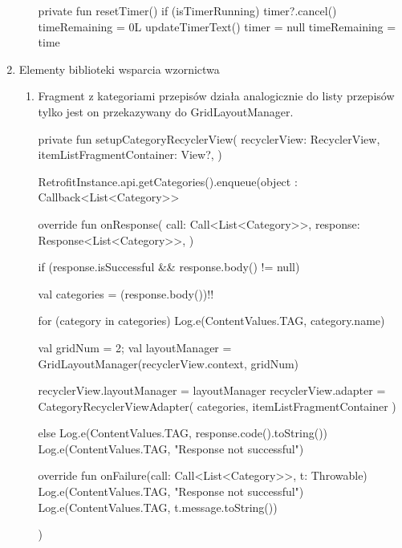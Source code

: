 \documentclass{article}
\begin{document}
\begin{enumerate}
\begin{enumerate}
\begin{mylisting}
private fun resetTimer() {
    if (isTimerRunning) {
        timer?.cancel()
        timeRemaining = 0L
        updateTimerText()
        timer = null
        timeRemaining = time
    }
}
\end{mylisting}

\end{enumerate}

\newpage

\item Elementy biblioteki wsparcia wzornictwa
\begin{enumerate}
    \item Fragment z kategoriami przepisów działa analogicznie do listy przepisów
     tylko jest on 
    przekazywany do GridLayoutManager.
\begin{mylisting}
private fun setupCategoryRecyclerView(
    recyclerView: RecyclerView,
    itemListFragmentContainer: View?,
) {
    RetrofitInstance.api.getCategories().enqueue(object : Callback<List<Category>> {
        override fun onResponse(
            call: Call<List<Category>>,
            response: Response<List<Category>>,
        ) {
            if (response.isSuccessful && response.body() != null) {
                val categories = (response.body())!!

                for (category in categories) {
                    Log.e(ContentValues.TAG, category.name)
                }

                val gridNum = 2;
                val layoutManager = GridLayoutManager(recyclerView.context, gridNum)

                recyclerView.layoutManager = layoutManager
                recyclerView.adapter = CategoryRecyclerViewAdapter(
                    categories, itemListFragmentContainer
                )
            } else {
                Log.e(ContentValues.TAG, response.code().toString())
                Log.e(ContentValues.TAG, "Response not successful")
            }
        }

        override fun onFailure(call: Call<List<Category>>, t: Throwable) {
            Log.e(ContentValues.TAG, "Response not successful")
            Log.e(ContentValues.TAG, t.message.toString())
        }
    })
}
\end{mylisting}

    \end{enumerate}

\end{enumerate}
\end{document}
